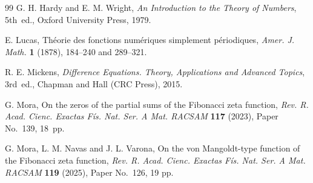 \documentclass[11pt, a4paper]{article}
\theoremstyle{plain}
\theoremstyle{definition}
\begin{document}
\begin{thebibliography}{99}
G. H. Hardy and E. M. Wright,
\textit{An Introduction to the Theory of Numbers},
5th~ed., Oxford University Press, 1979.




E. Lucas, %
Th\'eorie des fonctions num\'eriques simplement p\'eriodiques, 
\textit{Amer. J. Math.} \textbf{1} (1878), 184--240 and 289--321.

R. E. Mickens,
\textit{Difference Equations. Theory, Applications and Advanced Topics},
3rd~ed., Chapman and Hall (CRC Press), 2015.

G. Mora,
On the zeros of the partial sums of the Fibonacci zeta function,
\textit{Rev. R. Acad. Cienc. Exactas F\'is. Nat. Ser. A Mat. RACSAM} 
\textbf{117} (2023), Paper No.~139, 18~pp. %

G. Mora, L. M. Navas and J. L. Varona,
On the von Mangoldt-type function of the Fibonacci zeta function,
\textit{Rev. R. Acad. Cienc. Exactas F\'is. Nat. Ser. A Mat. RACSAM} 
\textbf{119} (2025), Paper No.~126, 19 pp. 




\end{thebibliography}
\end{document}
